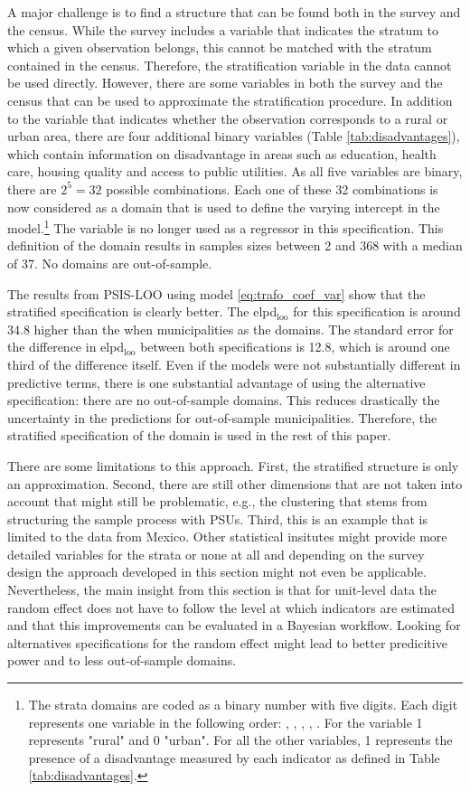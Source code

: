 A major challenge is to find a structure that can be found both in the survey and the census.
While the survey includes a variable that indicates the stratum to which a given observation belongs, this cannot be matched with the stratum contained in the census.
Therefore, the stratification variable in the data cannot be used directly.
However, there are some variables in both the survey and the census that can be used to approximate the stratification procedure.
In addition to the  variable that indicates whether the observation corresponds to a rural or urban area, there are four additional binary variables (Table \ref{tab:disadvantages}), which contain information on disadvantage in areas such as education, health care, housing quality and access to public utilities.
As all five variables are binary, there are $2^5 = 32$ possible combinations.
Each one of these 32 combinations is now considered as a domain that is used to define the varying intercept in the model.\footnote{The strata domains are coded as a binary number with five digits. Each digit represents one variable in the following order: , , , , . For the  variable 1 represents "rural" and 0 "urban". For all the other variables, 1 represents the presence of a disadvantage measured by each indicator as defined in Table \ref{tab:disadvantages}.}
The variable  is no longer used as a regressor in this specification.
This definition of the domain results in samples sizes between 2 and 368 with a median of 37.
No domains are out-of-sample.

The results from PSIS-LOO using model \ref{eq:trafo_coef_var} show that the stratified specification is clearly better. The elpd$_{\text{loo}}$ for this specification is around 34.8 higher than the when municipalities as the domains. The standard error for the difference in elpd$_{\text{loo}}$ between both specifications is 12.8, which is around one third of the difference itself.
Even if the models were not substantially different in predictive terms, there is one substantial advantage of using the alternative specification: there are no out-of-sample domains.
This reduces drastically the uncertainty in the predictions for out-of-sample municipalities.
Therefore, the stratified specification of the domain is used in the rest of this paper.

There are some limitations to this approach.
First, the stratified structure is only an approximation.
Second, there are still other dimensions that are not taken into account that might still be problematic, e.g., the clustering that stems from structuring the sample process with PSUs.
Third, this is an example that is limited to the data from Mexico.
Other statistical insitutes might provide more detailed variables for the strata or none at all and depending on the survey design the approach developed in this section might not even be applicable.
Nevertheless, the main insight from this section is that for unit-level data the random effect does not have to follow the level at which indicators are estimated and that this improvements can be evaluated in a Bayesian workflow.
Looking for alternatives specifications for the random effect might lead to better predicitive power and to less out-of-sample domains.
